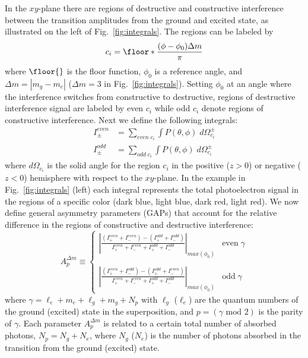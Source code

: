 In the $xy$-plane there are regions of destructive and constructive interference between the transition amplitudes from the ground and excited state, as illustrated on the left of Fig.~\ref{fig:integrals}. The regions can be labeled by
\begin{equation}
    c_i = \floor*{\frac{(\phi-\phi_0)\Delta m}{\pi}}
\end{equation}
where $\floor{}$ is the floor function, $\phi_0$ is a reference angle, and $\Delta m=|m_g-m_e|$ ($\Delta m = 3$ in Fig.~\ref{fig:integrals}). Setting $\phi_0$ at an angle where the interference switches from constructive to destructive, regions of destructive interference signal are labeled by even $c_i$ while odd $c_i$ denote regions of constructive interference. 
Next we define the following integrals:
\begin{align}
    I^{even}_{\pm} &= \sum_{even \; c_i} \int P(\theta,\phi)\; d\Omega_{c_i}^{\pm}\\
    I^{odd}_{\pm} &= \sum_{odd \; c_i} \int P(\theta,\phi)\; d\Omega_{c_i}^{\pm}
\end{align}
where $d\Omega_{c_i}$ is the solid angle for the region $c_i$ in the positive ($z>0$) or negative ($z<0$) hemisphere with respect to the $xy$-plane. In the example in Fig.~\ref{fig:integrals} (left) each integral represents the total photoelectron signal in the regions of a specific color (dark blue, light blue, dark red, light red). We now define general asymmetry parameters (GAPs) that account for the relative difference in the regions of constructive and destructive interference: 
\begin{equation}
\label{gaps}
    A_{p}^{\Delta m} \equiv \begin{cases} 
      \left|\frac{(I^{even}_+ + I^{even}_-) - (I^{odd}_++I^{odd}_-)}{I^{even}_++I^{even}_- + I^{odd}_++I^{odd}_-}\right|_{max(\phi_0)} & \text{even} \;  \gamma  \\ 
      \\
      \left|\frac{(I^{even}_++I^{odd}_-) - (I^{odd}_++I^{even}_-)}{I^{even}_++I^{even}_- + I^{odd}_++I^{odd}_-}\right|_{max(\phi_0)} & \text{odd} \;  \gamma 
  \end{cases}
\end{equation}
where $\gamma = \ell_e + m_e + \ell_g + m_g + N_p$ with $\ell_g$ ($\ell_e$) are the quantum numbers of the ground (excited) state in the superposition, and $p=(\gamma \text{ mod } 2)$ is the parity of $\gamma$. Each parameter $A_{p}^{\Delta m}$ is related to a certain total number of absorbed photons, $N_p = N_{g}+N_{e}$, where $N_g$ ($N_e$) is the number of photons absorbed in the transition from the ground (excited) state. 
